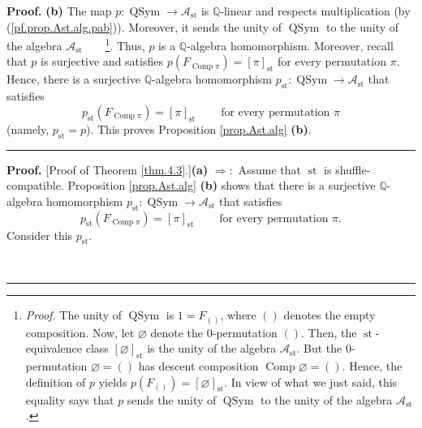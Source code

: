 \documentclass[numbers=enddot,12pt,final,onecolumn,notitlepage]{scrartcl}%
\theoremstyle{definition}
\newenvironment{proof}[1][Proof]{\noindent\textbf{#1.} }{\ \rule{0.5em}{0.5em}}
\newenvironment{verlong}{}{}
\begin{document}
\begin{verlong}
\begin{proof}
\textbf{(b)} The map $p:\operatorname*{QSym}\rightarrow\mathcal{A}%
_{\operatorname*{st}}$ is $\mathbb{Q}$-linear and respects multiplication (by
(\ref{pf.prop.Ast.alg.pab})). Moreover, it sends the unity of
$\operatorname*{QSym}$ to the unity of the algebra $\mathcal{A}%
_{\operatorname*{st}}$\ \ \ \ \footnote{\textit{Proof.} The unity of
$\operatorname*{QSym}$ is $1=F_{\left(  {}\right)  }$, where $\left(
{}\right)  $ denotes the empty composition. Now, let $\varnothing$ denote the
$0$-permutation $\left( \right)$.
Then, the $\operatorname*{st}$-equivalence class $\left[
\varnothing\right]  _{\operatorname*{st}}$ is the unity of the algebra
$\mathcal{A}_{\operatorname*{st}}$. But the $0$-permutation $\varnothing
= \left( \right)$
has descent composition $\operatorname*{Comp}\varnothing=\left(  {}\right)  $.
Hence, the definition of $p$ yields $p\left(  F_{\left(  {}\right)  }\right)
=\left[  \varnothing\right]  _{\operatorname*{st}}$. In view of what we just
said, this equality says that $p$ sends the unity of $\operatorname*{QSym}$ to
the unity of the algebra $\mathcal{A}_{\operatorname*{st}}$.}. Thus, $p$ is a
$\mathbb{Q}$-algebra homomorphism. Moreover, recall that $p$ is surjective and
satisfies $p\left(  F_{\operatorname*{Comp}\pi}\right)  =\left[  \pi\right]
_{\operatorname*{st}}$ for every permutation $\pi$. Hence, there is a
surjective $\mathbb{Q}$-algebra homomorphism $p_{\operatorname*{st}%
}:\operatorname*{QSym}\rightarrow\mathcal{A}_{\operatorname*{st}}$ that
satisfies
\[
p_{\operatorname*{st}}\left(  F_{\operatorname*{Comp}\pi}\right)  =\left[
\pi\right]  _{\operatorname*{st}}\ \ \ \ \ \ \ \ \ \ \text{for every
permutation }\pi
\]
(namely, $p_{\operatorname*{st}}=p$). This proves Proposition
\ref{prop.Ast.alg} \textbf{(b)}.
\end{proof}

\begin{proof}
[Proof of Theorem \ref{thm.4.3}.]\textbf{(a)} $\Longrightarrow:$ Assume that
$\operatorname*{st}$ is shuffle-compatible. Proposition \ref{prop.Ast.alg}
\textbf{(b)} shows that there is a surjective $\mathbb{Q}$-algebra
homomorphism $p_{\operatorname*{st}}:\operatorname*{QSym}\rightarrow
\mathcal{A}_{\operatorname*{st}}$ that satisfies
\begin{equation}
p_{\operatorname*{st}}\left(  F_{\operatorname*{Comp}\pi}\right)  =\left[
\pi\right]  _{\operatorname*{st}}\ \ \ \ \ \ \ \ \ \ \text{for every
permutation }\pi. \label{pf.thm.4.3.a.fwd.pst}%
\end{equation}
Consider this $p_{\operatorname*{st}}$.


\end{proof}
\end{verlong}
\end{document}
